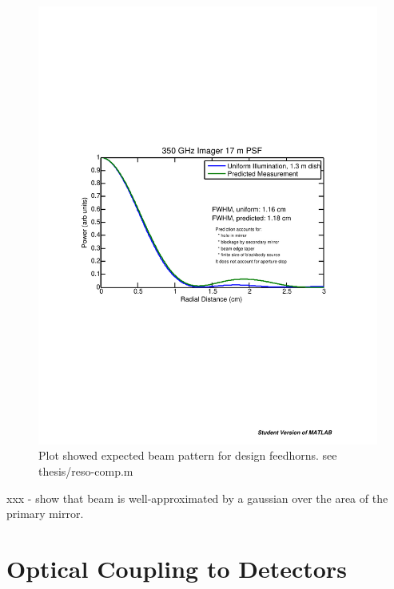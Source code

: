 \begin{figure}[th]
\centering
\includegraphics{images/ch4-reso-comp.pdf}
\caption{
Plot showed expected beam pattern for design feedhorns. see thesis/reso-comp.m
}
\label{fig:ch4-reso-comp}
\end{figure}

xxx - show that beam is well-approximated by a gaussian over the area of the primary mirror.

%


\section{Optical Coupling to Detectors}

